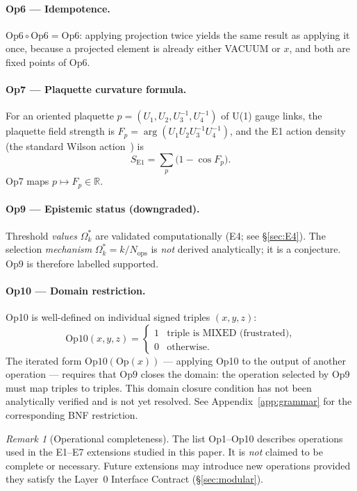 \documentclass[12pt,a4paper]{article}
\theoremstyle{plain}
\theoremstyle{definition}
\theoremstyle{remark}
\newtheorem{remark}[theorem]{Remark}
\begin{document}
\paragraph{Op6 --- Idempotence.}
$\mathrm{Op6}\circ\mathrm{Op6} = \mathrm{Op6}$:
applying projection twice yields the same result as applying it once,
because a projected element is already either VACUUM or $x$, and both are
fixed points of Op6.

\paragraph{Op7 --- Plaquette curvature formula.}
For an oriented plaquette $p = (U_1,U_2,U_3^{-1},U_4^{-1})$ of U(1) gauge
links, the plaquette field strength is
$F_p = \arg(U_1 U_2 U_3^{-1} U_4^{-1})$,
and the E1 action density (the standard Wilson action~\cite{Wilson1974}) is
\begin{equation}\label{eq:SE1}
  S_{\mathrm{E1}} = \sum_p \bigl(1 - \cos F_p\bigr).
\end{equation}
Op7 maps $p \mapsto F_p \in \mathbb{R}$.

\paragraph{Op9 --- Epistemic status (downgraded).}
Threshold \emph{values} $\Omega_k^*$ are validated computationally (E4;
see \S\ref{sec:E4}). The selection \emph{mechanism}
$\Omega_k^* = k/N_{\mathrm{ops}}$ is \emph{not} derived analytically;
it is a conjecture. Op9 is therefore labelled supported.

\paragraph{Op10 --- Domain restriction.}
Op10 is well-defined on individual signed triples $(x,y,z)$:
\[
  \mathrm{Op10}(x,y,z) =
  \begin{cases} 1 & \text{triple is MIXED (frustrated),} \\ 0 & \text{otherwise.} \end{cases}
\]
The iterated form $\mathrm{Op10}(\mathrm{Op}(x))$ --- applying Op10 to the
output of another operation --- requires that $\mathrm{Op9}$ closes the domain:
the operation selected by Op9 must map triples to triples.
This domain closure condition has not been analytically verified and is
not yet resolved.
See Appendix~\ref{app:grammar} for the corresponding BNF restriction.

\begin{remark}[Operational completeness]
The list Op1--Op10 describes operations used in the E1--E7 extensions
studied in this paper. It is \emph{not} claimed to be complete or
necessary. Future extensions may introduce new operations provided they
satisfy the Layer~0 Interface Contract (\S\ref{sec:modular}).
\end{remark}
\end{document}
